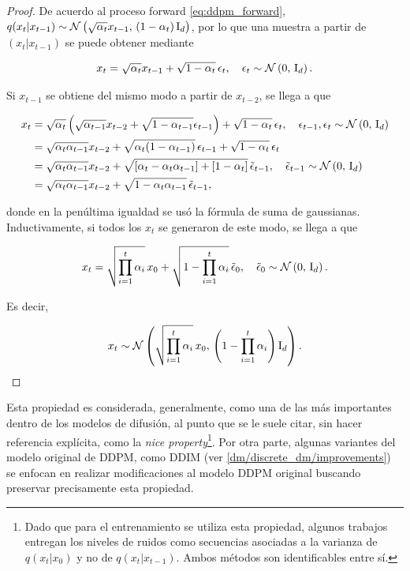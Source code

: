 \begin{proof}

    De acuerdo al proceso forward \eqref{eq:ddpm_forward}, $q(x_t|x_{t-1}) \sim \mathcal{N}\left(\sqrt{\alpha_t} x_{t-1},\,(1-\alpha_t)\operatorname{I}_{d}\right)$, por lo que una muestra a partir de $(x_t|x_{t-1})$ se puede obtener mediante

    \begin{equation*}
        x_t = \sqrt{\alpha_t} x_{t-1} + \sqrt{1-\alpha_t}\, \epsilon_t,
        \quad
        \epsilon_t\sim\mathcal{N}\left(0,\,\operatorname{I}_{d}\right).
    \end{equation*}

    Si $x_{t-1}$ se obtiene del mismo modo a partir de $x_{t-2}$, se llega a que

    \begin{align*}
        x_t &= \sqrt{\alpha_t} \left(\sqrt{\alpha_{t-1}} x_{t-2} + \sqrt{1-\alpha_{t-1}} \epsilon_{t-1}\right) + \sqrt{1-\alpha_t}\, \epsilon_t, \quad \epsilon_{t-1},\epsilon_t\sim\mathcal{N}\left(0,\,\operatorname{I}_{d}\right)\\
        &= \sqrt{\alpha_t\alpha_{t-1}} x_{t-2} + \sqrt{\alpha_t(1-\alpha_{t-1})}\,\epsilon_{t-1} + \sqrt{1-\alpha_t}\,\epsilon_t\\
        &= \sqrt{\alpha_t\alpha_{t-1}} x_{t-2} + \sqrt{[\alpha_t-\alpha_t\alpha_{t-1}]+[1-\alpha_t]}\, \tilde{\epsilon}_{t-1},\quad\tilde{\epsilon}_{t-1}\sim\mathcal{N}\left(0,\,\operatorname{I}_{d}\right)\\\
        &= \sqrt{\alpha_t\alpha_{t-1}} x_{t-2} + \sqrt{1-\alpha_t\alpha_{t-1}}\, \tilde{\epsilon}_{t-1},
    \end{align*}

    donde en la penúltima igualdad se usó la fórmula de suma de gaussianas. Inductivamente, si todos los $x_t$ se generaron de este modo, se llega a que

    \begin{equation*}
        x_t = \sqrt{\prod_{i=1}^t \alpha_i}\, x_0 + \sqrt{1-\prod_{i=1}^t \alpha_i}\, \tilde{\epsilon}_0,
        \quad\tilde{\epsilon}_0\sim\mathcal{N}\left(0,\,\operatorname{I}_{d}\right).
    \end{equation*}

    Es decir,

    \begin{equation*}
        x_t\sim\mathcal{N}\left(\sqrt{\prod_{i=1}^t \alpha_i}\, x_0,\,\left(1-\prod_{i=1}^t \alpha_i\right)\operatorname{I}_{d}\right).
    \end{equation*}
\end{proof}

Esta propiedad es considerada, generalmente, como una de las más importantes dentro de los modelos de difusión, al punto que se le suele citar, sin hacer referencia explícita, como la \textit{nice property}\footnote{Dado que para el entrenamiento se utiliza esta propiedad, algunos trabajos entregan los niveles de ruidos como secuencias asociadas a la varianza de $q(x_t|x_0)$ y no de $q(x_{t}|x_{t-1})$. Ambos métodos son identificables entre sí.}. Por otra parte, algunas variantes del modelo original de DDPM, como DDIM (ver \autoref{dm/discrete_dm/improvements}) se enfocan en realizar modificaciones al modelo DDPM original buscando preservar precisamente esta propiedad.

